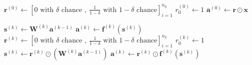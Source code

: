 \documentclass{article}
\begin{document}
          \begin{algorithm}
            \caption{%
              Algorithm \ref{algevaldrop} with matrix-vector notation.
            }
            \begin{algorithmic}
                \State $
                  \mathbf{r}^{(0)} \gets
                    \left[
                      0 \text{ with } \delta \text{ chance },
                      \ \frac{1}{1-\delta} \text{ with } 1-\delta \text{ chance}
                    \right]_{i=1}^{n_{0}}
                $
                \State $r_0^{(0)} \gets 1$
                \State $\mathbf{a}^{(0)} \gets \mathbf{r} \odot \mathbf{x}$

                    \State $
                      \mathbf{s}^{(k)} \gets \mathbf{W}^{(k)} \mathbf{a}^{(k-1)}
                    $
                    \State $
                      \mathbf{a}^{(k)} \gets
                        \mathbf{f}^{(k)} \left( \mathbf{s}^{(k)} \right)
                    $
                  \Else
                    \State $
                      \mathbf{r}^{(k)} \gets
                        \left[
                          0 \text{ with } \delta \text{ chance },
                          \ \frac{1}{1-\delta} \text{ with } 1-\delta \text{ chance}
                        \right]_{i=1}^{n_k}
                    $
                    \State $r_0^{(k)} \gets 1$
                    \State $
                      \mathbf{s}^{(k)} \gets
                        \mathbf{r}^{(k)}
                        \odot
                        \left( \mathbf{W}^{(k)} \mathbf{a}^{(k-1)} \right)
                    $
                    \State $
                      \mathbf{a}^{(k)} \gets
                        \mathbf{r}^{(k)}
                        \odot
                        \mathbf{f}^{(k)} \left( \mathbf{s}^{(k)} \right)
                    $
                  \EndIf
                \EndFor
              \EndProcedure
            \end{algorithmic}
          \end{algorithm}
\end{document}
